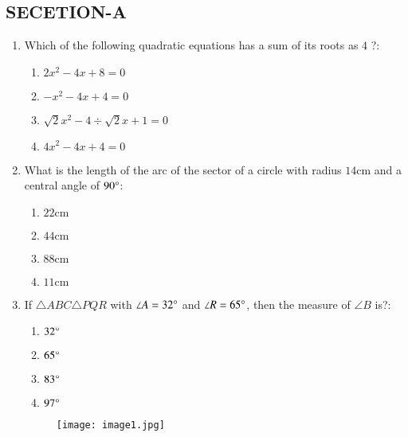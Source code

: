 \documentclass[12pt-letter paper]{article}
\begin{document}
                                      
\begin{center}                                    
\section*{SECETION-A}        
\end{center}    
\begin{enumerate}                                                                        
\item Which of the following quadratic equations has a sum of its roots as  $4$ ?:  
\begin{enumerate}
\item $ 2x^2 - 4x + 8 = 0 $                          
\item $ -x^2 - 4x + 4 = 0 $                          
\item $ \sqrt{2}x^2 - 4 \div \sqrt{2}x + 1 = 0 $
\item $ 4x^2 - 4x + 4 = 0 $
\end{enumerate}
\item What is the length of the arc of the sector of a circle with radius $14\mathrm{cm}$ and a central angle of $90\degree$:    
\begin{enumerate}
\item  $ 22\mathrm{cm} $                                                        
\item  $ 44\mathrm{cm} $
\item  $ 88\mathrm{cm}$                                            
\item  $ 11\mathrm{cm}$
\end{enumerate}
\item If $\triangle ABC  \triangle PQR$ with $\angle A = 32\degree $ and $\angle R = 65\degree$, then the measure of $\angle B$ is?:
\begin{enumerate}
\item $ 32\degree $                                                
\item $ 65\degree $                                            
\item $ 83\degree $                                
\item $ 97\degree $
\end{enumerate}
\begin{figure}[!ht]                              
\centering                              
\texttt{[image: image1.jpg]}      
\label{fig:enter-label}                                

\end{figure}
\end{enumerate}
\end{document}
